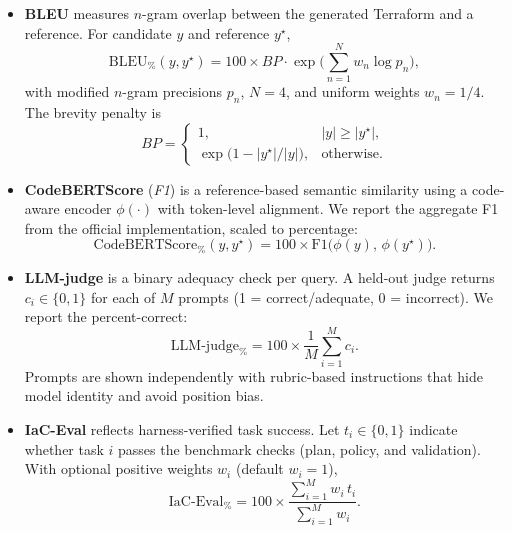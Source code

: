 \documentclass[acmsmall,screen,review,anonymous]{acmart}
\begin{document}
\begin{itemize}
  \item \textbf{BLEU} measures $n$-gram overlap between the generated Terraform and a reference. For candidate $y$ and reference $y^\star$,
  \begin{equation}
    \mathrm{BLEU}_{\%}(y,y^\star) = 100 \times BP \cdot \exp\!\Bigg(\sum_{n=1}^{N} w_n \log p_n\Bigg),
  \end{equation}
  with modified $n$-gram precisions $p_n$, $N{=}4$, and uniform weights $w_n{=}1/4$. The brevity penalty is
  \begin{equation}
    BP =
    \begin{cases}
      1, & |y| \ge |y^\star|,\\[2pt]
      \exp\!\big(1 - {|y^\star|}/{|y|}\big), & \text{otherwise}.
    \end{cases}
  \end{equation}

  \item \textbf{CodeBERTScore} (\emph{F1}) is a reference-based semantic similarity using a code-aware encoder $\phi(\cdot)$ with token-level alignment. We report the aggregate F1 from the official implementation, scaled to percentage:
  \begin{equation}
    \mathrm{CodeBERTScore}_{\%}(y,y^\star) = 100 \times \mathrm{F1}\big(\phi(y),\,\phi(y^\star)\big).
  \end{equation}

  \item \textbf{LLM-judge} is a binary adequacy check per query. A held-out judge returns $c_i \in \{0,1\}$ for each of $M$ prompts (1 = correct/adequate, 0 = incorrect). We report the percent-correct:
  \begin{equation}
    \mathrm{LLM\text{-}judge}_{\%} = 100 \times \frac{1}{M}\sum_{i=1}^{M} c_i.
  \end{equation}
  Prompts are shown independently with rubric-based instructions that hide model identity and avoid position bias.

  \item \textbf{IaC-Eval} reflects harness-verified task success. Let $t_i \in \{0,1\}$ indicate whether task $i$ passes the benchmark checks (plan, policy, and validation). With optional positive weights $w_i$ (default $w_i{=}1$),
  \begin{equation}
    \mathrm{IaC\text{-}Eval}_{\%} = 100 \times \frac{\sum_{i=1}^{M} w_i\, t_i}{\sum_{i=1}^{M} w_i}.
  \end{equation}
\end{itemize}
\end{document}
